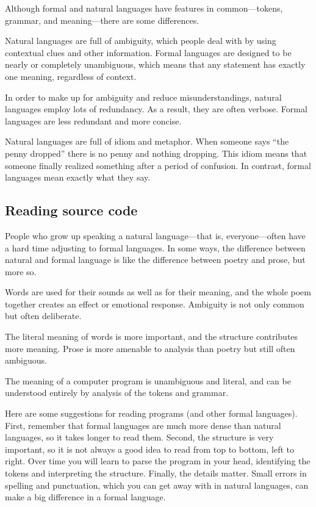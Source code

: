Although formal and natural languages have features in common---tokens, grammar, and meaning---there are some differences.

\begin{description}

Natural languages are full of ambiguity, which people deal with by using contextual clues and other information.
Formal languages are designed to be nearly or completely unambiguous, which means that any statement has exactly one meaning, regardless of context.

In order to make up for ambiguity and reduce misunderstandings, natural languages employ lots of redundancy.
As a result, they are often verbose.
Formal languages are less redundant and more concise.

Natural languages are full of idiom and metaphor.
When someone says ``the penny dropped'' there is no penny and nothing dropping.
This idiom means that someone finally realized something after a period of confusion.
In contrast, formal languages mean exactly what they say.

\end{description}

\subsection{Reading source code}

People who grow up speaking a natural language---that is, everyone---often have a hard time adjusting to formal languages.
In some ways, the difference between natural and formal language is like the difference between poetry and prose, but more so.

\begin{description}

Words are used for their sounds as well as for their meaning, and the whole poem together creates an effect or emotional response.
Ambiguity is not only common but often deliberate.

The literal meaning of words is more important, and the structure contributes more meaning.
Prose is more amenable to analysis than poetry but still often ambiguous.

The meaning of a computer program is unambiguous and literal, and can be understood entirely by analysis of the tokens and grammar.

\end{description}

Here are some suggestions for reading programs (and other formal languages).
First, remember that formal languages are much more dense than natural languages, so it takes longer to read them.
Second, the structure is very important, so it is not always a good idea to read from top to bottom, left to right.
Over time you will learn to parse the program in your head, identifying the tokens and interpreting the structure.
Finally, the details matter.
Small errors in spelling and punctuation, which you can get away with in natural languages, can make a big difference in a formal language.

